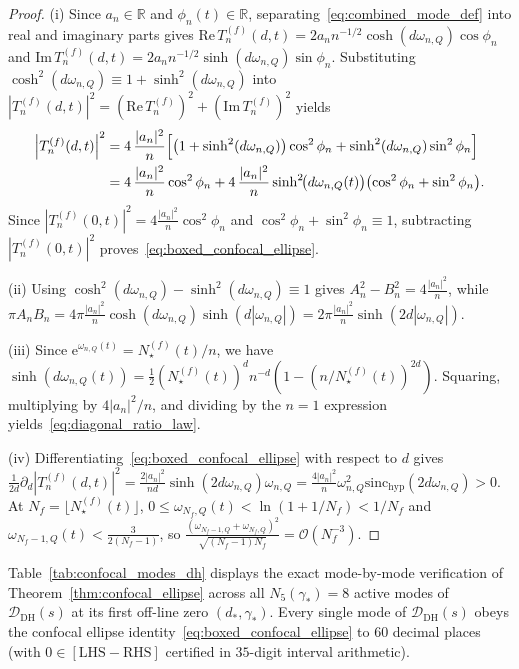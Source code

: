 \documentclass[11pt,reqno]{amsart}
\theoremstyle{definition}
\theoremstyle{remark}
\numberwithin{equation}{section}
\newcommand{\R}{\mathbb{R}}
\newcommand{\ee}{\mathrm{e}}
\newcommand{\Rea}{\mathrm{Re}}
\newcommand{\Ima}{\mathrm{Im}}
\newcommand{\sinch}{\mathrm{sinc}_{\mathrm{hyp}}}
\newcommand{\DHf}{\mathrm{DH}}
\begin{document}
\begin{proof}
(i) Since $a_n \in \R$ and $\phi_n(t) \in \R$, separating~\eqref{eq:combined_mode_def} into real and imaginary parts gives $\Rea\,T_n^{(f)}(d,t) = 2a_n n^{-1/2}\cosh(d\omega_{n,Q})\cos\phi_n$ and $\Ima\,T_n^{(f)}(d,t) = 2a_n n^{-1/2}\sinh(d\omega_{n,Q})\sin\phi_n$. Substituting $\cosh^2(d\omega_{n,Q}) \equiv 1 + \sinh^2(d\omega_{n,Q})$ into $|T_n^{(f)}(d,t)|^2 = (\Rea\,T_n^{(f)})^2 + (\Ima\,T_n^{(f)})^2$ yields
\[
\begin{aligned}
\Bigl|T_n^{(f)}(d,t)\Bigr|^2 &= 4\,\frac{|a_n|^2}{n}\Bigl[\bigl(1 + \sinh^2(d\omega_{n,Q})\bigr)\cos^2\phi_n + \sinh^2(d\omega_{n,Q})\sin^2\phi_n\Bigr] \\
&= 4\,\frac{|a_n|^2}{n}\cos^2\phi_n + 4\,\frac{|a_n|^2}{n}\sinh^2\!\bigl(d\omega_{n,Q}(t)\bigr)\bigl(\cos^2\phi_n + \sin^2\phi_n\bigr).
\end{aligned}
\]
Since $|T_n^{(f)}(0,t)|^2 = 4\frac{|a_n|^2}{n}\cos^2\phi_n$ and $\cos^2\phi_n + \sin^2\phi_n \equiv 1$, subtracting $|T_n^{(f)}(0,t)|^2$ proves~\eqref{eq:boxed_confocal_ellipse}.

(ii) Using $\cosh^2(d\omega_{n,Q}) - \sinh^2(d\omega_{n,Q}) \equiv 1$ gives $A_n^2 - B_n^2 = 4\frac{|a_n|^2}{n}$, while $\pi A_n B_n = 4\pi\frac{|a_n|^2}{n}\cosh(d\omega_{n,Q})\sinh(d|\omega_{n,Q}|) = 2\pi\frac{|a_n|^2}{n}\sinh(2d|\omega_{n,Q}|)$.

(iii) Since $\ee^{\omega_{n,Q}(t)} = N_\star^{(f)}(t)/n$, we have $\sinh(d\omega_{n,Q}(t)) = \frac{1}{2}(N_\star^{(f)}(t))^d n^{-d}(1 - (n/N_\star^{(f)}(t))^{2d})$. Squaring, multiplying by $4|a_n|^2/n$, and dividing by the $n = 1$ expression yields~\eqref{eq:diagonal_ratio_law}.

(iv) Differentiating~\eqref{eq:boxed_confocal_ellipse} with respect to $d$ gives $\frac{1}{2d}\partial_d|T_n^{(f)}(d,t)|^2 = \frac{2|a_n|^2}{nd}\sinh(2d\omega_{n,Q})\omega_{n,Q} = \frac{4|a_n|^2}{n}\omega_{n,Q}^2\sinch(2d\omega_{n,Q}) > 0$. At $N_f = \lfloor N_\star^{(f)}(t)\rfloor$, $0 \le \omega_{N_f,Q}(t) < \ln(1 + 1/N_f) < 1/N_f$ and $\omega_{N_f-1,Q}(t) < \frac{3}{2(N_f-1)}$, so $\frac{(\omega_{N_f-1,Q}+\omega_{N_f,Q})^2}{\sqrt{(N_f-1)N_f}} = \mathcal{O}(N_f^{-3})$.
\end{proof}

Table~\ref{tab:confocal_modes_dh} displays the exact mode-by-mode verification of Theorem~\ref{thm:confocal_ellipse} across all $N_5(\gamma_*) = 8$ active modes of $\mathcal{D}_{\DHf}(s)$ at its first off-line zero $(d_*, \gamma_*)$. Every single mode of $\mathcal{D}_{\DHf}(s)$ obeys the confocal ellipse identity~\eqref{eq:boxed_confocal_ellipse} to $60$ decimal places (with $0 \in [\mathrm{LHS}-\mathrm{RHS}]$ certified in $35$-digit interval arithmetic).
\end{document}
